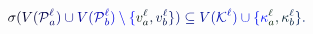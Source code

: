 \documentclass[12pt]{article}
\begin{document}
\makeatletter
\renewcommand*{\@textcolor}[3]{%
  \protect\leavevmode
  \begingroup
    \color#1{#2}#3%
  \endgroup
}
\makeatother
\begin{displaymath}
\mathcolor[RGB]{0,0,15}{\sigma} \mathcolor[RGB]{0,0,30}{(} \mathcolor[RGB]{0,0,45}{V} \mathcolor[RGB]{0,0,60}{(} \mathcal { \mathcolor[RGB]{0,0,75}{P} } _ { \mathcolor[RGB]{0,0,90}{a} } ^ { \mathcolor[RGB]{0,0,105}{\ell} } \mathcolor[RGB]{0,0,120}{)} \mathcolor[RGB]{0,0,135}{\cup} \mathcolor[RGB]{0,0,150}{V} \mathcolor[RGB]{0,0,165}{(} \mathcal { \mathcolor[RGB]{0,0,180}{P} } _ { \mathcolor[RGB]{0,0,195}{b} } ^ { \mathcolor[RGB]{0,0,210}{\ell} } \mathcolor[RGB]{0,0,225}{)} \mathcolor[RGB]{0,0,240}{\setminus} \mathcolor[RGB]{0,0,255}{\{} \mathcolor[RGB]{0,15,0}{v} _ { \mathcolor[RGB]{0,15,15}{a} } ^ { \mathcolor[RGB]{0,15,30}{\ell} } \mathcolor[RGB]{0,15,45}{,} \mathcolor[RGB]{0,15,60}{v} _ { \mathcolor[RGB]{0,15,75}{b} } ^ { \mathcolor[RGB]{0,15,90}{\ell} } \mathcolor[RGB]{0,15,105}{\}} \mathcolor[RGB]{0,15,120}{)} \mathcolor[RGB]{0,15,135}{\subseteq} \mathcolor[RGB]{0,15,150}{V} \mathcolor[RGB]{0,15,165}{(} \mathcal { \mathcolor[RGB]{0,15,180}{K} } ^ { \mathcolor[RGB]{0,15,195}{\ell} } \mathcolor[RGB]{0,15,210}{)} \mathcolor[RGB]{0,15,225}{\cup} \mathcolor[RGB]{0,15,240}{\{} \mathcolor[RGB]{0,15,255}{\kappa} _ { \mathcolor[RGB]{0,30,0}{a} } ^ { \mathcolor[RGB]{0,30,15}{\ell} } \mathcolor[RGB]{0,30,30}{,} \mathcolor[RGB]{0,30,45}{\kappa} _ { \mathcolor[RGB]{0,30,60}{b} } ^ { \mathcolor[RGB]{0,30,75}{\ell} } \mathcolor[RGB]{0,30,90}{\}} \mathcolor[RGB]{0,30,105}{.}
\end{displaymath}
\end{document}
